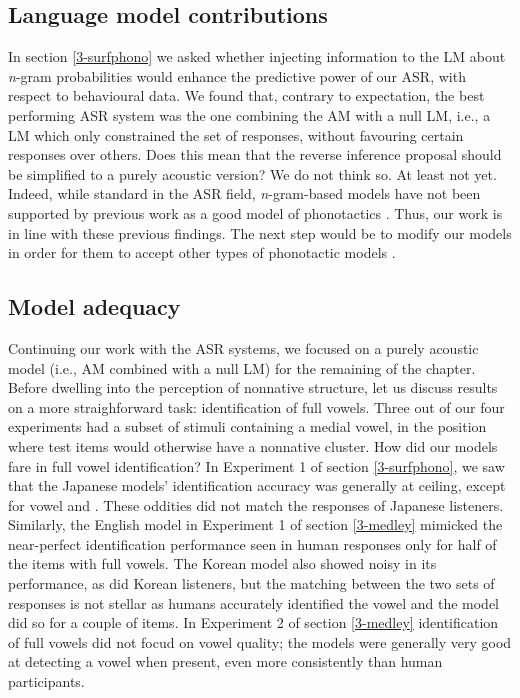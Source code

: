 {\subsection{Language model contributions} 
In section \ref{3-surfphono} we asked whether injecting information to the LM about \textit{n}-gram probabilities would enhance the predictive power of our ASR, with respect to behavioural data. We found that, contrary to expectation, the best performing ASR system was the one combining the AM with a null LM, i.e., a LM which only constrained the set of responses, without favouring certain responses over others. Does this mean that the reverse inference proposal should be simplified to a purely acoustic version? We do not think so. At least not yet. Indeed, while standard in the ASR field, \textit{n}-gram-based models have not been supported by previous work as a good model of phonotactics \cite{hayes2008}. Thus, our work is in line with these previous findings. The next step would be to modify our models in order for them to accept other types of phonotactic models \cite{hayes2008, albright2009}.        
\subsection{Model adequacy}
Continuing our work with the ASR systems, we focused on a purely acoustic model (i.e., AM combined with a null LM) for the remaining of the chapter. Before dwelling into the perception of nonnative structure, let us discuss results on a more straighforward task: identification of full vowels. Three out of our four experiments had a subset of stimuli containing a medial vowel, in the position where test items would otherwise have a nonnative cluster. How did our models fare in full vowel identification? In Experiment 1 of section \ref{3-surfphono}, we saw that the Japanese models' identification accuracy was generally at ceiling, except for vowel  and . These oddities did not match the responses of Japanese listeners. Similarly, the English model in Experiment 1 of section \ref{3-medley} mimicked the near-perfect identification performance seen in human responses only for half of the items with full vowels. The Korean model also showed noisy in its performance, as did Korean listeners, but the matching between the two sets of responses is not stellar as humans accurately identified the vowel  and the model did so for a couple of items. In Experiment 2 of section \ref{3-medley} identification of full vowels did not focud on vowel quality; the models were generally very good at detecting a vowel when present, even more consistently than human participants.      

}
